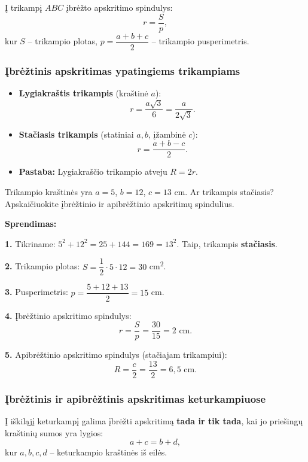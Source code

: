 \begin{tcolorbox}[colback=green!5!white, colframe=green!60!black, title=Įbrėžtinio apskritimo spindulys]
Į trikampį $ABC$ įbrėžto apskritimo spindulys:
\[
r = \frac{S}{p},
\]
kur $S$ – trikampio plotas, $p = \dfrac{a+b+c}{2}$ – trikampio pusperimetris.
\end{tcolorbox}

\subsubsection*{Įbrėžtinis apskritimas ypatingiems trikampiams}

\begin{itemize}
  \item \textbf{Lygiakraštis trikampis} (kraštinė $a$):
  \[
  r = \frac{a\sqrt{3}}{6} = \frac{a}{2\sqrt{3}}.
  \]
  \item \textbf{Stačiasis trikampis} (statiniai $a, b$, įžambinė $c$):
  \[
  r = \frac{a + b - c}{2}.
  \]
  \item \textbf{Pastaba:} Lygiakraščio trikampio atveju $R = 2r$.
\end{itemize}

\begin{example}
Trikampio kraštinės yra $a = 5$, $b = 12$, $c = 13$ cm. Ar trikampis stačiasis? Apskaičiuokite įbrėžtinio ir apibrėžtinio apskritimų spindulius.

\textbf{Sprendimas:}

\textbf{1.} Tikriname: $5^2 + 12^2 = 25 + 144 = 169 = 13^2$. Taip, trikampis \textbf{stačiasis}.

\textbf{2.} Trikampio plotas: $S = \dfrac{1}{2} \cdot 5 \cdot 12 = 30$ cm\textsuperscript{2}.

\textbf{3.} Pusperimetris: $p = \dfrac{5 + 12 + 13}{2} = 15$ cm.

\textbf{4.} Įbrėžtinio apskritimo spindulys:
\[
r = \frac{S}{p} = \frac{30}{15} = 2 \text{ cm}.
\]

\textbf{5.} Apibrėžtinio apskritimo spindulys (stačiajam trikampiui):
\[
R = \frac{c}{2} = \frac{13}{2} = 6{,}5 \text{ cm}.
\]
\end{example}

\subsubsection*{Įbrėžtinis ir apibrėžtinis apskritimas keturkampiuose}

\begin{theorem}
Į iškiląjį keturkampį galima įbrėžti apskritimą \textbf{tada ir tik tada}, kai jo priešingų kraštinių sumos yra lygios:
\[
a + c = b + d,
\]
kur $a, b, c, d$ – keturkampio kraštinės iš eilės.
\end{theorem}

